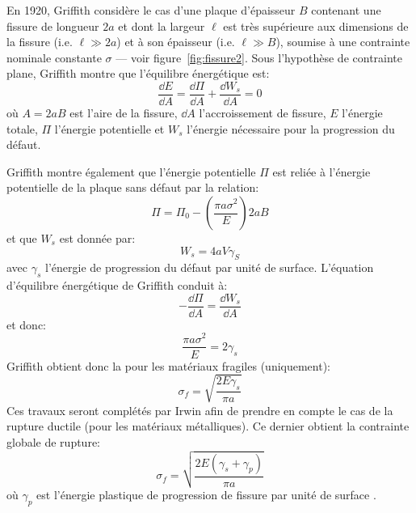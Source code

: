\medskip
En 1920, Griffith considère le cas d'une plaque
d'épaisseur $B$ contenant une fissure de longueur $2a$ et dont la largeur $\ell$ est très supérieure
aux dimensions de la fissure (i.e. $\ell\gg 2a$) et à son épaisseur (i.e. $\ell\gg B$), soumise à une contrainte nominale constante $\sigma$ --- voir figure~\ref{fig:fissure2}.
\medskipvm
Sous l'hypothèse de contrainte plane, Griffith montre
que l'équilibre énergétique est:
\begin{equation} \frac{\dd E}{\dd A} = \dfrac{\dd\Pi}{\dd A}+\frac{\dd W_s}{\dd A} = 0 \end{equation}
où $A=2aB$ est l'aire de la fissure, $\dd A$ l'accroissement de fissure, $E$ l'énergie
totale, $\Pi$ l'énergie potentielle et $W_s$ l'énergie nécessaire pour la progression du
défaut.

\medskip
Griffith montre également que l'énergie potentielle
$\Pi$ est reliée à l'énergie potentielle de la plaque sans défaut par la relation:
\begin{equation} \Pi=\Pi_0 -\left( \dfrac{\pi a \sigma^2}{E} \right) 2aB \end{equation}
et que $W_s$ est donnée par:
\begin{equation} W_s=4aV\gamma_S\end{equation}
avec $\gamma_s$ l'énergie de progression du défaut par unité de surface.
L'équation d'équilibre énergétique de Griffith conduit à:
\begin{equation}-\frac{\dd\Pi}{\dd A}=\frac{\dd W_s}{\dd A}\end{equation} et donc:
\begin{equation}\frac{\pi a\sigma^2}{E}=2\gamma_s\end{equation}
\medskipvm
Griffith obtient donc la  pour les matériaux fragiles (uniquement):
\begin{equation} \sigma_f = \sqrt{\dfrac{2E\gamma_s}{\pi a}} \end{equation}
Ces travaux seront complétés par Irwin afin de
prendre en compte le cas de la rupture ductile (pour les matériaux métalliques).
Ce dernier obtient la contrainte globale de rupture:
\begin{equation} \sigma_f = \sqrt{\dfrac{2E(\gamma_s+\gamma_p)}{\pi a}} \end{equation}
où $\gamma_p$ est l'énergie plastique de progression de fissure par unité de surface
.


